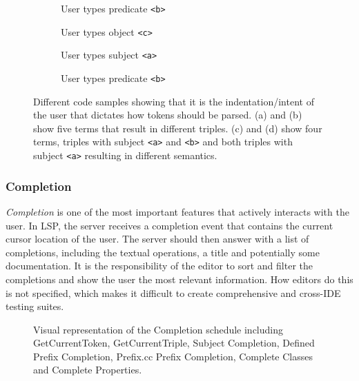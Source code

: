 \begin{figure}[tb]
    \centering
    \begin{subfigure}{0.21\textwidth}
      
      \caption{User types predicate \texttt{<b>}}
      \label{code1}
    \end{subfigure}
    \hfill
    \begin{subfigure}{0.21\textwidth}
      
      \caption{User types object \texttt{<c>}}
      \label{code2}
    \end{subfigure}
    \hfill
    \begin{subfigure}{0.21\textwidth}
      
      \caption{User types subject \texttt{<a>}}
      \label{code3}
    \end{subfigure}
    \hfill
    \begin{subfigure}{0.21\textwidth}
      
      \caption{User types predicate \texttt{<b>}}
      \label{code4}
    \end{subfigure}
    \caption{Different code samples showing that it is the indentation/intent of the user that dictates how tokens should be parsed. (a) and (b) show five terms that result in different triples. (c) and (d) show four terms, triples with subject \texttt{<a>} and \texttt{<b>} and both triples with subject \texttt{<a>} resulting in different semantics.    }\label{lst:GroupedListing}
\end{figure}



\subsubsection{Completion}

\textit{Completion} is one of the most important features that actively interacts with the user.
In LSP, the server receives a completion event that contains the current cursor location of the user.
The server should then answer with a list of completions, including the textual operations, a title and potentially some documentation.
It is the responsibility of the editor to sort and filter the completions and show the user the most relevant information.
How editors do this is not specified, which makes it difficult to create comprehensive and cross-IDE testing suites.

\begin{figure}[!ht]
 \centering
  \caption{Visual representation of the Completion schedule including GetCurrentToken, GetCurrentTriple, Subject Completion, Defined Prefix Completion, Prefix.cc Prefix Completion, Complete Classes and Complete Properties.}\label{fig:Completion}
\end{figure}

